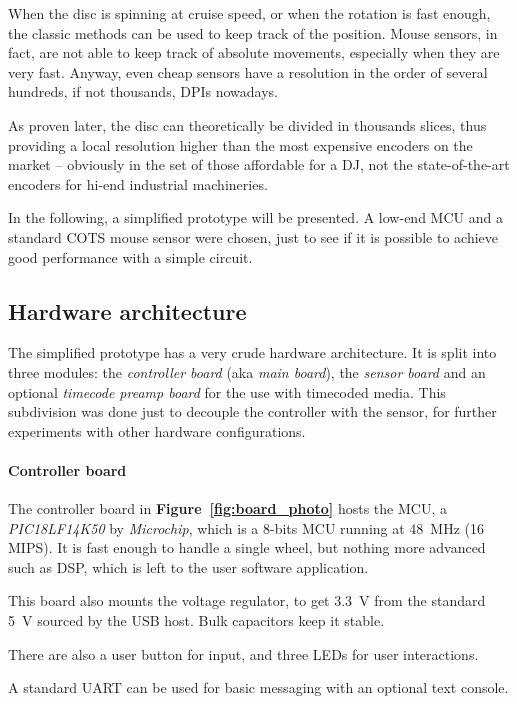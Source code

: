 \documentclass[a4paper,10pt]{article}
\newcommand{\citef}[1]{\textbf{Figure~\ref{#1}}}
\begin{document}
\begin{multicols}{2}
When the disc is spinning at cruise speed, or when the rotation is fast
enough, the classic methods can be used to keep track of the position.
Mouse sensors, in fact, are not able to keep track of absolute movements,
especially when they are very fast. Anyway, even cheap sensors have a
resolution in the order of several hundreds, if not thousands, DPIs nowadays.

As proven later, the disc can theoretically be divided in thousands slices,
thus providing a local resolution higher than the most expensive encoders on
the market -- obviously in the set of those affordable for a DJ, not the
state-of-the-art encoders for hi-end industrial machineries.

In the following, a simplified prototype will be presented. A low-end MCU and
a standard COTS mouse sensor were chosen, just to see if it is possible to
achieve good performance with a simple circuit.


\subsection{Hardware architecture}

The simplified prototype has a very crude hardware architecture. It is split
into three modules: the \emph{controller board} (aka \emph{main board}), the
\emph{sensor board} and an optional \emph{timecode preamp board} for the use
with timecoded media. This subdivision was done just to decouple the
controller with the sensor, for further experiments with other hardware
configurations.


\paragraph{Controller board}
The controller board in \citef{fig:board_photo} hosts the MCU, a
\emph{PIC18LF14K50} \cite{microchip_pic18lf14k50} by \emph{Microchip}, which
is a 8-bits MCU running at 48~MHz (16 MIPS). It is fast enough to handle a
single wheel, but nothing more advanced such as DSP, which is left to the
user software application.

This board also mounts the voltage regulator, to get 3.3~V from the standard
5~V sourced by the USB host. Bulk capacitors keep it stable.

There are also a user button for input, and three LEDs for user interactions.

A standard UART can be used for basic messaging with an optional text console.


\end{multicols}
\end{document}
